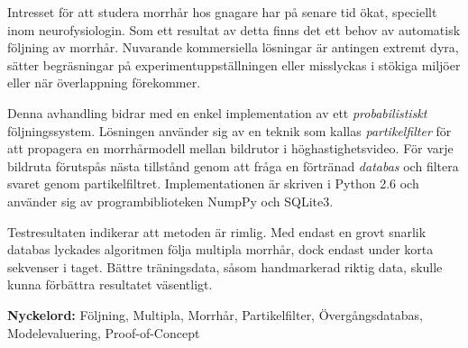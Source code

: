 
Intresset för att studera morrhår hos gnagare har på senare tid
ökat, speciellt inom neurofysiologin.  Som ett resultat av detta
finns det ett behov av automatisk följning av morrhår.  Nuvarande
kommersiella lösningar är antingen extremt dyra, sätter
begräsningar på experimentuppställningen eller misslyckas i
stökiga miljöer eller när överlappning förekommer.

Denna avhandling bidrar med en enkel implementation av ett
\emph{probabilistiskt} följningssystem.  Lösningen använder sig av
en teknik som kallas \emph{partikelfilter} för att propagera en
morrhårmodell mellan bildrutor i höghastighetsvideo.  För varje
bildruta förutspås nästa tillstånd genom att fråga en förtränad
\emph{databas} och filtera svaret genom partikelfiltret.
Implementationen är skriven i Python 2.6 och använder sig av
programbiblioteken NumpPy och SQLite3.

Testresultaten indikerar att metoden är rimlig.  Med endast en grovt
snarlik databas lyckades algoritmen följa multipla morrhår, dock
endast under korta sekvenser i taget.  Bättre träningsdata, såsom
handmarkerad riktig data, skulle kunna förbättra resultatet
väsentligt.


\textbf{Nyckelord:} Följning, Multipla, Morrhår, Partikelfilter,
Övergångsdatabas, Modelevaluering, Proof-of-Concept
